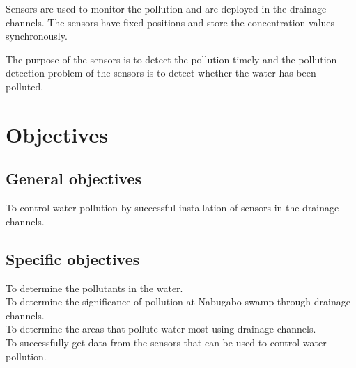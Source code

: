 \documentclass{article}
\begin{document}
Sensors are used to monitor the pollution and are deployed in the drainage channels. The sensors have fixed positions and store the concentration values synchronously. 

The purpose of the sensors is to detect the pollution timely and the pollution detection problem of the sensors is to detect whether the water has been polluted. 

\section{Objectives}

\subsection {General objectives}
	To control water pollution by successful installation of sensors in the drainage channels.
 
\subsection {Specific objectives}
To determine the pollutants in the water.\\
To determine the significance of pollution at Nabugabo swamp through drainage channels.\\
To determine the areas that pollute water most using drainage channels. \\
To successfully get data from the sensors that can be used to control water pollution.\\
\end{document}
